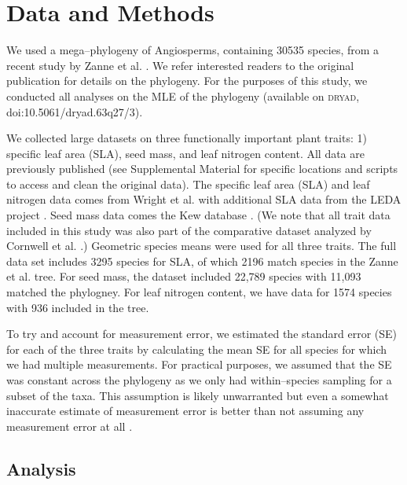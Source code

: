 \documentclass[a4paper,12pt]{article}
\begin{document}
\section{Data and Methods}

We used a mega--phylogeny of Angiosperms, containing 30535 species, from a recent study by Zanne et al. \citep{Zanne2013}. We refer interested readers to the original publication \citep{Zanne2013} for details on the phylogeny. For the purposes of this study, we conducted all analyses on the MLE of the phylogeny (available on \textsc{dryad}, doi:10.5061/dryad.63q27/3).

We collected large datasets on three functionally important plant traits: 1) specific leaf area (SLA), seed mass, and leaf nitrogen content. All data are previously published (see Supplemental Material for specific locations and scripts to access and clean the original data). The specific leaf area (SLA) and leaf nitrogen data comes from Wright et al. \citep{Wright2004} with additional SLA data from the LEDA project \citep{Kleyer2008}. Seed mass data comes the Kew database \citep{Kew2008}. (We note that all trait data included in this study was also part of the comparative dataset analyzed by Cornwell et al. \citep{ksi}.) Geometric species means were used for all three traits. 
The full data set includes 3295 species for SLA, of which 2196 match species in the Zanne et al. tree. For seed mass, the dataset included 22,789 species with 11,093 matched the phylogney. For leaf nitrogen content, we have data for 1574 species with 936 included in the tree.

To try and account for measurement error, we estimated the standard error (SE) for each of the three traits by calculating the mean SE for all species for which we had multiple measurements. For practical purposes, we assumed that the SE was constant across the phylogeny as we only had within--species sampling for a subset of the taxa. This assumption is likely unwarranted but even a somewhat inaccurate estimate of measurement error is better than not assuming any measurement error at all \citep{Hansen2012}.

\subsection{Analysis}
\end{document}
